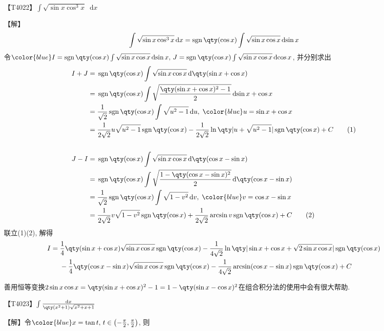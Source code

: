 \documentclass{ctexbook}
\DeclareMathOperator{\sgn}{sgn}
\newcommand*{\dif}{\mathop{}\!\mathrm{d}}
\begin{document}
{【T4022】$\int\sqrt{\sin{x}\cos^{3}{x}}\dif{x}$\par
【解】
\begin{align*}
\int\sqrt{\sin{x}\cos^{3}{x}}\dif{x}=\sgn{\qty(\cos{x})}\int\sqrt{\sin{x}\cos{x}}\dif{\sin{x}}
\end{align*}
令$\color{blue}I=\sgn{\qty(\cos{x})}\int\sqrt{\sin{x}\cos{x}}\dif{\sin{x}},\,J=\sgn{\qty(\cos{x})}\int\sqrt{\sin{x}\cos{x}}\dif{\cos{x}}$, 并分别求出
\begin{align*}
I+J={}&\sgn{\qty(\cos{x})}\int\sqrt{\sin{x}\cos{x}}\dif{\qty(\sin{x}+\cos{x})}\\
={}&\sgn{\qty(\cos{x})}\int\sqrt{\frac{\qty(\sin{x}+\cos{x})^{2}-1}{2}}\dif{\sin{x}+\cos{x}}\\
={}&\frac{1}{\sqrt{2}}\sgn{\qty(\cos{x})}\int\sqrt{u^{2}-1}\dif{u},\;{\color{blue}u=\sin{x}+\cos{x}}\\
={}&\frac{1}{2\sqrt{2}}u\sqrt{u^{2}-1}\sgn{\qty(\cos{x})}-\frac{1}{2\sqrt{2}}\ln\qty|u+\sqrt{u^{2}-1}|\sgn{\qty(\cos{x})}+C\tag{1}\\
\\
J-I={}&\sgn{\qty(\cos{x})}\int\sqrt{\sin{x}\cos{x}}\dif{\qty(\cos{x}-\sin{x})}\\
={}&\sgn{\qty(\cos{x})}\int\sqrt{\frac{1-\qty(\cos{x}-\sin{x})^{2}}{2}}\dif{\qty(\cos{x}-\sin{x})}\\
={}&\frac{1}{\sqrt{2}}\sgn{\qty(\cos{x})}\int\sqrt{1-v^{2}}\dif{v},\;{\color{blue}v=\cos{x}-\sin{x}}\\
={}&\frac{1}{2\sqrt{2}}v\sqrt{1-v^{2}}\sgn{\qty(\cos{x})}+\frac{1}{2\sqrt{2}}\arcsin{v}\sgn{\qty(\cos{x})}+C\tag{2}
\end{align*}
联立(1)(2), 解得
\begin{align*}
I={}&\frac{1}{4}\qty(\sin{x}+\cos{x})\sqrt{\sin{x}\cos{x}}\sgn{\qty(\cos{x})}-\frac{1}{4\sqrt{2}}\ln\qty|\sin{x}+\cos{x}+\sqrt{2\sin{x}\cos{x}}|\sgn{\qty(\cos{x})}\\
{}&-\frac{1}{4}\qty(\cos{x}-\sin{x})\sqrt{\sin{x}\cos{x}}\sgn{\qty(\cos{x})}-\frac{1}{4\sqrt{2}}\arcsin(\cos{x}-\sin{x})\sgn{\qty(\cos{x})}+C
\end{align*}\par
{\kaishu 善用恒等变换$2\sin{x}\cos{x}=\qty(\sin{x}+\cos{x})^{2}-1=1-\qty(\sin{x}-\cos{x})^{2}$在组合积分法的使用中会有很大帮助. \par}
【T4023】$\int\frac{\dif{x}}{\qty(x^{2}+1)\sqrt{x^{2}+x+1}}$\par
【解】令$\color{blue}x=\tan{t},\,t\in\left(-\frac{\pi}{2},\frac{\pi}{2}\right)$, 则
\begin{align*}

\end{align*}}
\end{document}
